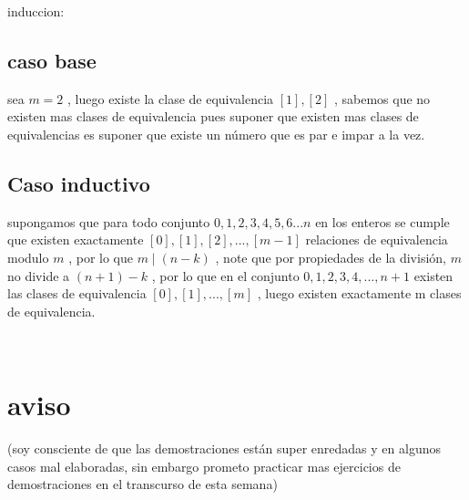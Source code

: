 \documentclass[10pt,a4paper]{article} %
\begin{document}
            induccion:
            \subsection{caso base}

                sea $ m = 2  $ , luego existe la clase de equivalencia $ [1] , [2]
                $ , sabemos que no existen mas clases de equivalencia pues suponer
                que existen mas clases de equivalencias es suponer que existe un
                número que es par e impar a la vez.

            \subsection{Caso inductivo}

                supongamos que para todo conjunto $ {0,1,2,3,4,5,6 ... n} $ en los
                enteros se cumple que existen  exactamente $ [0] , [1] , [2] , ..., [m-1]  $
                relaciones de equivalencia modulo $ m  $ , por lo que  $ m \mid
                (n-k)  $  , note que por propiedades de la división, $ m  $ no
                divide a $ (n+1) -k  $  , por lo que en el conjunto $ {0,1,2,3
                , 4, ...  , n+1}  $ existen las clases de equivalencia $ [0] ,
                [1] , ... , [m]  $  , luego existen exactamente m clases de equivalencia.


                \\
        \section{aviso}
        (soy consciente de que las demostraciones están super enredadas y
        en algunos casos mal elaboradas, sin embargo prometo practicar
        mas ejercicios de
        demostraciones  en el transcurso de esta semana)















    \nocite{*}

    
    
\end{document}
